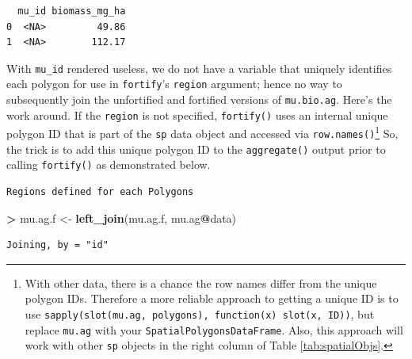 \documentclass[]{krantz}
\makeatletter
\newenvironment{Shaded}{\begin{snugshade}}{\end{snugshade}}
\newcommand{\KeywordTok}[1]{\textcolor[rgb]{0.27,0.27,0.27}{\textbf{#1}}}
\newcommand{\StringTok}[1]{\textcolor[rgb]{0.5,0.5,0.5}{#1}}
\newcommand{\OperatorTok}[1]{\textcolor[rgb]{0.43,0.43,0.43}{\textbf{#1}}}
\newcommand{\ErrorTok}[1]{\textcolor[rgb]{0.14,0.14,0.14}{\textbf{#1}}}
\newcommand{\NormalTok}[1]{#1}
\newenvironment{kframe}{%
\medskip{}
\setlength{\fboxsep}{.8em}
 \def\at@end@of@kframe{}%
 \ifinner\ifhmode%
  \def\at@end@of@kframe{\end{minipage}}%
  \begin{minipage}{\columnwidth}%
 \fi\fi%
 \def\FrameCommand##1{\hskip\@totalleftmargin \hskip-\fboxsep
 \colorbox{shadecolor}{##1}\hskip-\fboxsep
     \hskip-\linewidth \hskip-\@totalleftmargin \hskip\columnwidth}%
 \MakeFramed {\advance\hsize-\width
   \@totalleftmargin\z@ \linewidth\hsize
   \@setminipage}}%
 {\par\unskip\endMakeFramed%
 \at@end@of@kframe}
\renewenvironment{Shaded}{\begin{kframe}}{\end{kframe}}
\makeatother
\begin{document}
\begin{verbatim}
  mu_id biomass_mg_ha
0  <NA>         49.86
1  <NA>        112.17
\end{verbatim}

With \texttt{mu\_id} rendered useless, we do not have a variable that
uniquely identifies each polygon for use in \texttt{fortify}'s
\texttt{region} argument; hence no way to subsequently join the
unfortified and fortified versions of \texttt{mu.bio.ag}. Here's the
work around. If the \texttt{region} is not specified, \texttt{fortify()}
uses an internal unique polygon ID that is part of the \texttt{sp} data
object and accessed via \texttt{row.names()}\footnote{With other data,
  there is a chance the row names differ from the unique polygon IDs.
  Therefore a more reliable approach to getting a unique ID is to use
  \texttt{sapply(slot(mu.ag,\ \textquotesingle{}polygons\textquotesingle{}),\ function(x)\ slot(x,\ \textquotesingle{}ID\textquotesingle{}))},
  but replace \texttt{mu.ag} with your
  \texttt{SpatialPolygonsDataFrame}. Also, this approach will work with
  other \texttt{sp} objects in the right column of Table
  \ref{tab:spatialObjs}.} So, the trick is to add this unique polygon ID
to the \texttt{aggregate()} output prior to calling \texttt{fortify()}
as demonstrated below.

\begin{Shaded}
\end{Shaded}

\begin{verbatim}
Regions defined for each Polygons
\end{verbatim}

\begin{Shaded}
\begin{Highlighting}[]
\OperatorTok{>}\StringTok{ }\NormalTok{mu.ag.f <-}\StringTok{ }\KeywordTok{left_join}\NormalTok{(mu.ag.f, mu.ag}\OperatorTok{@}\NormalTok{data)}
\end{Highlighting}
\end{Shaded}

\begin{verbatim}
Joining, by = "id"
\end{verbatim}
\end{document}
